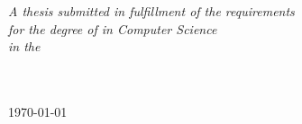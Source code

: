\begin{titlepage}
\begin{center}
\large \textit{A thesis submitted in fulfillment of the requirements\\ for the degree of \degreename{} in Computer Science}\\[0.3cm] %
\textit{in the}\\[0.4cm]
\href{https://uni-tuebingen.de/en/faculties/faculty-of-science/departments/computer-science/department/}{\deptname} \\ \href{https://eml-unitue.de}{\groupname}\\[1cm] %
 
\vfill

{\large \usdate\today}\\%
 
\vfill
\end{center}

\end{titlepage}


\blankpage
\addtocounter{page}{-1}
